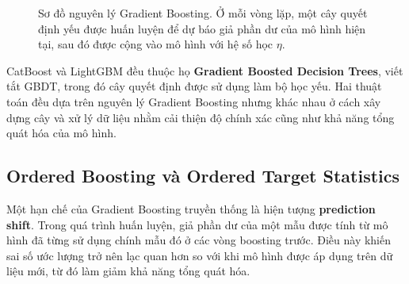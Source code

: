 \documentclass[a4paper]{report}
\begin{document}
\begin{figure}[H]
  \centering
  \caption{Sơ đồ nguyên lý Gradient Boosting. Ở mỗi vòng lặp, một cây quyết
  định yếu được huấn luyện để dự báo giả phần dư của mô hình hiện tại, sau đó
  được cộng vào mô hình với hệ số học $\eta$.}
  \label{fig:boosting}
\end{figure}

CatBoost và LightGBM đều thuộc họ \textbf{Gradient Boosted Decision Trees},
viết tắt GBDT, trong đó cây quyết định được sử dụng làm bộ học yếu. Hai thuật toán đều
dựa trên nguyên lý Gradient Boosting nhưng khác nhau ở cách xây dựng cây và xử
lý dữ liệu nhằm cải thiện độ chính xác cũng như khả năng tổng quát hóa của mô
hình.

\subsection{Ordered Boosting và Ordered Target Statistics}

Một hạn chế của Gradient Boosting truyền thống là hiện tượng
\textbf{prediction shift}. Trong quá trình huấn luyện, giả phần dư của một mẫu
được tính từ mô hình đã từng sử dụng chính mẫu đó ở các vòng boosting trước.
Điều này khiến sai số ước lượng trở nên lạc quan hơn so với khi mô hình được áp
dụng trên dữ liệu mới, từ đó làm giảm khả năng tổng quát hóa.
\end{document}
